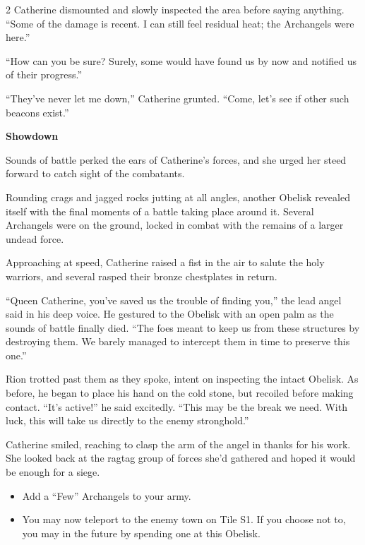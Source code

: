 \begin{multicols*}{2}
Catherine dismounted and slowly inspected the area before saying anything.
``Some of the damage is recent.
I can still feel residual heat; the Archangels were here.''

``How can you be sure? Surely, some would have found us by now and notified us of their progress.''

``They've never let me down,'' Catherine grunted.
``Come, let's see if other such beacons exist.''

\textbf{Showdown}

Sounds of battle perked the ears of Catherine's forces, and she urged her steed forward to catch sight of the combatants.

Rounding crags and jagged rocks jutting at all angles, another Obelisk revealed itself with the final moments of a battle taking place around it.
Several Archangels were on the ground, locked in combat with the remains of a larger undead force.

Approaching at speed, Catherine raised a fist in the air to salute the holy warriors, and several rasped their bronze chestplates in return.

``Queen Catherine, you've saved us the trouble of finding you,'' the lead angel said in his deep voice.
He gestured to the Obelisk with an open palm as the sounds of battle finally died.
``The foes meant to keep us from these structures by destroying them.
We barely managed to intercept them in time to preserve this one.''

Rion trotted past them as they spoke, intent on inspecting the intact Obelisk.
As before, he began to place his hand on the cold stone, but recoiled before making contact.
``It's active!'' he said excitedly.
``This may be the break we need.
With luck, this will take us directly to the enemy stronghold.''

Catherine smiled, reaching to clasp the arm of the angel in thanks for his work.
She looked back at the ragtag group of forces she'd gathered and hoped it would be enough for a siege.

\begin{itemize}
  \item \textcolor{darkcandyapplered}{Add a ``Few'' Archangels to your army.}
  \item \textcolor{darkcandyapplered}{You may now teleport to the enemy town on Tile S1.
    If you choose not to, you may in the future by spending one  at this Obelisk.}
\end{itemize}



\end{multicols*}
